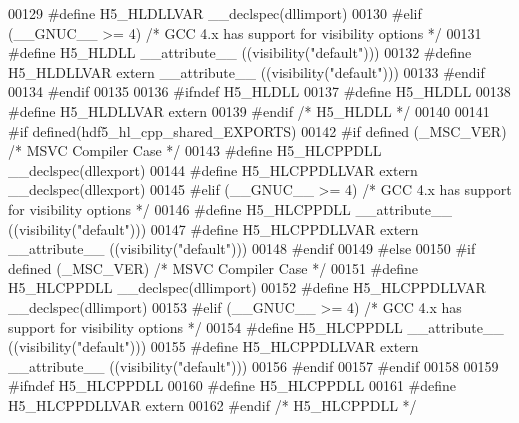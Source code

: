 \begin{DoxyCode}
00129 \textcolor{preprocessor}{    #define H5\_HLDLLVAR \_\_declspec(dllimport)}
00130 \textcolor{preprocessor}{  #elif (\_\_GNUC\_\_ >= 4)  }\textcolor{comment}{/* GCC 4.x has support for visibility options */}\textcolor{preprocessor}{}
00131 \textcolor{preprocessor}{    #define H5\_HLDLL \_\_attribute\_\_ ((visibility("default")))}
00132 \textcolor{preprocessor}{    #define H5\_HLDLLVAR extern \_\_attribute\_\_ ((visibility("default")))}
00133 \textcolor{preprocessor}{  #endif}
00134 \textcolor{preprocessor}{#endif}
00135 
00136 \textcolor{preprocessor}{#ifndef H5\_HLDLL}
00137 \textcolor{preprocessor}{  #define H5\_HLDLL}
00138 \textcolor{preprocessor}{  #define H5\_HLDLLVAR extern}
00139 \textcolor{preprocessor}{#endif }\textcolor{comment}{/* H5\_HLDLL */}\textcolor{preprocessor}{}
00140 
00141 \textcolor{preprocessor}{#if defined(hdf5\_hl\_cpp\_shared\_EXPORTS)}
00142 \textcolor{preprocessor}{  #if defined (\_MSC\_VER)  }\textcolor{comment}{/* MSVC Compiler Case */}\textcolor{preprocessor}{}
00143 \textcolor{preprocessor}{    #define H5\_HLCPPDLL \_\_declspec(dllexport)}
00144 \textcolor{preprocessor}{    #define H5\_HLCPPDLLVAR extern \_\_declspec(dllexport)}
00145 \textcolor{preprocessor}{  #elif (\_\_GNUC\_\_ >= 4)  }\textcolor{comment}{/* GCC 4.x has support for visibility options */}\textcolor{preprocessor}{}
00146 \textcolor{preprocessor}{    #define H5\_HLCPPDLL \_\_attribute\_\_ ((visibility("default")))}
00147 \textcolor{preprocessor}{    #define H5\_HLCPPDLLVAR extern \_\_attribute\_\_ ((visibility("default")))}
00148 \textcolor{preprocessor}{  #endif}
00149 \textcolor{preprocessor}{#else}
00150 \textcolor{preprocessor}{  #if defined (\_MSC\_VER)  }\textcolor{comment}{/* MSVC Compiler Case */}\textcolor{preprocessor}{}
00151 \textcolor{preprocessor}{    #define H5\_HLCPPDLL \_\_declspec(dllimport)}
00152 \textcolor{preprocessor}{    #define H5\_HLCPPDLLVAR \_\_declspec(dllimport)}
00153 \textcolor{preprocessor}{  #elif (\_\_GNUC\_\_ >= 4)  }\textcolor{comment}{/* GCC 4.x has support for visibility options */}\textcolor{preprocessor}{}
00154 \textcolor{preprocessor}{    #define H5\_HLCPPDLL \_\_attribute\_\_ ((visibility("default")))}
00155 \textcolor{preprocessor}{    #define H5\_HLCPPDLLVAR extern \_\_attribute\_\_ ((visibility("default")))}
00156 \textcolor{preprocessor}{  #endif}
00157 \textcolor{preprocessor}{#endif}
00158 
00159 \textcolor{preprocessor}{#ifndef H5\_HLCPPDLL}
00160 \textcolor{preprocessor}{  #define H5\_HLCPPDLL}
00161 \textcolor{preprocessor}{  #define H5\_HLCPPDLLVAR extern}
00162 \textcolor{preprocessor}{#endif }\textcolor{comment}{/* H5\_HLCPPDLL */}\textcolor{preprocessor}{}

\end{DoxyCode}
